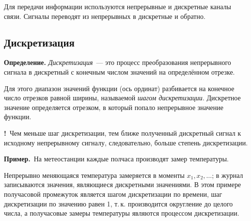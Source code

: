 \documentclass[a4paper,11pt]{article}
\newcommand{\imp}{\textbf{\color{red!70!black}!}\ }
\newcommand{\prim}{\textbf{Пример.}\ }
\begin{document}
Для передачи информации используются непрерывные и дискретные каналы связи.
Сигналы переводят из непрерывных в дискретные и обратно.

\subsection{Дискретизация}

\begin{opr}
\textbf{Определение.} \emph{Дискретизация}~--- это процесс преобразования непрерывного сигнала
в дискретный с конечным числом значений на определённом отрезке.
\end{opr}

Для этого диапазон значений функции (ось ординат) разбивается на конечное
число отрезков равной ширины, называемой \emph{шагом дискретизации}.
Дискретное значение определяется отрезком, в который попало непрерывное значение функции.

\imp Чем меньше шаг дискретизации, тем ближе полученный дискретный сигнал к исходному
непрерывному сигналу, следовательно, больше степень дискретизации.

\prim На метеостанции каждые полчаса производят замер температуры.

\begin{center}
\end{center}

Непрерывно меняющаяся температура замеряется в моменты $x_1, x_2, \dots$; в журнал записываются
значения, являющиеся дискретными значениями. В этом примере получасовой промежуток является шагом
дискретизации по времени, шаг дискретизации по значению равен 1, т.\,к. производится округление
до целого числа, а получасовые замеры температуры являются процессом дискретизации.
\end{document}
